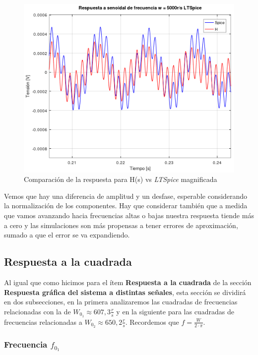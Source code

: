 \documentclass[11pt,a4paper]{report}
\begin{document}
\begin{figure}[h!]
\centering
\includegraphics[scale=0.96]{rtaSenoidalAltoSpiceCloseComp.png}
\caption{Comparación de la respuesta para H(s) vs \textit{LTSpice} magnificada}
\end{figure}

Vemos que hay una diferencia de amplitud y un desfase, esperable considerando la normalización de los componentes. Hay que considerar también que a medida que vamos avanzando hacia frecuencias altas o bajas nuestra respuesta tiende más a cero y las simulaciones son más propensas a tener errores de aproximación, sumado a que el error se va expandiendo.

\subsection*{Respuesta a la cuadrada}

Al igual que como hicimos para el ítem \textbf{Respuesta a la cuadrada} de la sección \textbf{Respuesta gráfica del sistema a distintas señales}, esta sección se dividirá en dos subsecciones, en la primera analizaremos las cuadradas de frecuencias relacionadas con la de $W_{0_{1}} \approx 607,3 \frac{r}{s}$ y en la siguiente para las cuadradas de frecuencias relacionadas a $W_{0_{2}} \approx 650,2 \frac{r}{s}$. Recordemos que $f = \frac{W}{2 \cdot \pi}$.

\subsubsection*{Frecuencia $f_{0_{1}}$}
\end{document}
